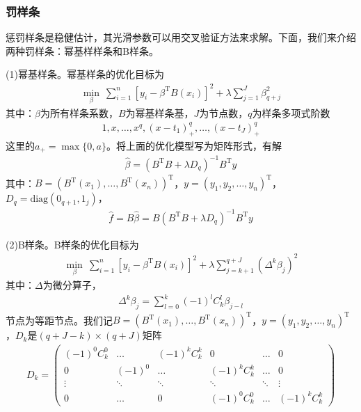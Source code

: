         \subsubsection{罚样条}
            \par
            惩罚样条是稳健估计，其光滑参数可以用交叉验证方法来求解。下面，我们来介绍两种罚样条：幂基样样条和B样条。
            \par
            (1)幂基样条。幂基样条的优化目标为
            \begin{align*}
            \min_\beta \ \sum_{i=1}^n[y_i - \beta^\mathrm{T}B(x_i)]^2 + \lambda \sum_{j = 1}^J\beta_{q+j}^2
            \end{align*}
            其中：$\beta$为所有样条系数，$B$为幂基样条基，$J$为节点数，$q$为样条多项式阶数
            \begin{align*}
            1,x,\dots,x^q,(x-t_1)^q_+,\dots,(x-t_J)^q_+
            \end{align*}
            这里的$a_+ = \max\{0,a\}$。将上面的优化模型写为矩阵形式，有解
            \begin{align*}
            \hat{\beta} = (B^\mathrm{T}B+\lambda D_q)^{-1}B^\mathrm{T}y
            \end{align*}
            其中：$B=(B^\mathrm{T}(x_1),\dots,B^\mathrm{T}(x_n))^\mathrm{T}$，$y = (y_1,y_2,\dots,y_n)^\mathrm{T}$，$D_q = \mathrm{diag}(0_{q+1},1_j)$，
            \begin{align*}
            \hat{f} = B\hat{\beta} = B(B^\mathrm{T}B+\lambda D_q)^{-1}B^\mathrm{T}y
            \end{align*}
            \par
            (2)B样条。B样条的优化目标为
            \begin{align*}
            \min_\beta \ \sum_{i=1}^n[y_i -\beta^\mathrm{T}B(x_i)]^2 + \lambda\sum_{j = k+1}^{q+J} (\Delta^k\beta_j)^2
            \end{align*}
            其中：$\Delta$为微分算子，
            \begin{align*}
            \Delta^k \beta_j = \sum_{l = 0}^k(-1)^lC_k^l\beta_{j-l}
            \end{align*}
            节点为等距节点。我们记$B=(B^\mathrm{T}(x_1),\dots,B^\mathrm{T}(x_n))^\mathrm{T}$，$y = (y_1,y_2,\dots,y_n)^\mathrm{T}$，$D_k$是$(q+J-k)\times(q+J)$矩阵
            \begin{align*}
            D_k =
            \begin{pmatrix}
            (-1)^0C_k^0&\dots&(-1)^kC_k^k&0&\dots&0\\
            0&(-1)^0&\dots&(-1)^kC_k^k&\dots&0\\
            \vdots&\ddots&\ddots&\ddots&\ddots&\vdots\\
            0&\dots&0&(-1)^0C_k^0&\dots&(-1)^kC_k^k
            \end{pmatrix}
            \end{align*}
